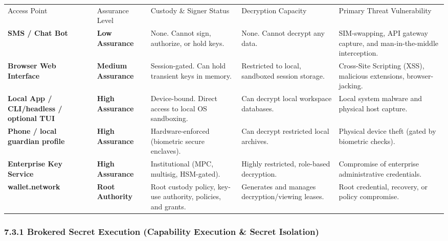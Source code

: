 \documentclass[
  11pt,
]{article}
\begin{document}
\begin{longtable}[]{@{}
  >{\raggedright\arraybackslash}p{}
  >{\raggedright\arraybackslash}p{}
  >{\raggedright\arraybackslash}p{}
  >{\raggedright\arraybackslash}p{}
  >{\raggedright\arraybackslash}p{}@{}}
\toprule\noalign{}
& & & & \\
\midrule\noalign{}
\endhead
\bottomrule\noalign{}
\endlastfoot
Access Point & Assurance Level & Custody \& Signer Status & Decryption
Capacity & Primary Threat Vulnerability \\
\textbf{SMS / Chat Bot} & \textbf{Low Assurance} & None. Cannot sign,
authorize, or hold keys. & None. Cannot decrypt any data. &
SIM-swapping, API gateway capture, and man-in-the-middle
interception. \\
\textbf{Browser Web Interface} & \textbf{Medium Assurance} &
Session-gated. Can hold transient keys in memory. & Restricted to local,
sandboxed session storage. & Cross-Site Scripting (XSS), malicious
extensions, browser-jacking. \\
\textbf{Local App / CLI/headless / optional TUI} & \textbf{High
Assurance} & Device-bound. Direct access to local OS sandboxing. & Can
decrypt local workspace databases. & Local system malware and physical
host capture. \\
\textbf{Phone / local guardian profile} & \textbf{High Assurance} & Hardware-enforced
(biometric secure enclaves). & Can decrypt restricted local archives. &
Physical device theft (gated by biometric checks). \\
\textbf{Enterprise Key Service} & \textbf{High Assurance} &
Institutional (MPC, multisig, HSM-gated). & Highly restricted,
role-based decryption. & Compromise of enterprise administrative
credentials. \\
\textbf{wallet.network} & \textbf{Root Authority} & Root custody policy,
key-use authority, policies, and grants. & Generates and manages
decryption/viewing leases. & Root credential, recovery, or policy
compromise. \\
\end{longtable}

\hypertarget{the-credential-enclave-capability-execution-secret-isolation}{%
\subsubsection{7.3.1 Brokered Secret Execution (Capability Execution \&
Secret
Isolation)}\label{the-credential-enclave-capability-execution-secret-isolation}}
\end{document}
